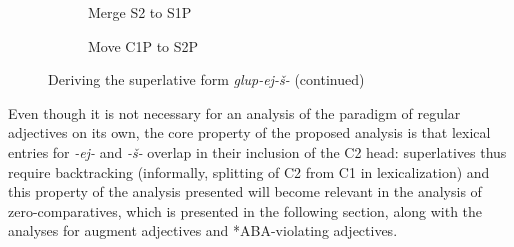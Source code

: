 \documentclass[output=paper,colorlinks,citecolor=brown]{langscibook}
\begin{document}
\begin{figure}
 \begin{subfigure}[b]{0.45\textwidth}
    \centering
 \caption{Merge S2 to S1P}
    \label{kas:fig:glupeis_g}
\end{subfigure}\hfill\begin{subfigure}[b]{0.54\textwidth}
    \centering
    \caption{Move C1P to S2P}
    \label{kas:fig:glupeis_h}
\end{subfigure}
    \caption{Deriving the superlative form \textit{glup-ej-š-} (continued)}
    \label{kas:fig:glupeis-ctd}
\end{figure}

Even though it is not necessary for an analysis of the paradigm of regular adjectives on its own, the core property of the proposed analysis is that lexical entries for \textit{-ej-} and \textit{-š-} overlap in their inclusion of the C2 head: superlatives thus require backtracking (informally, splitting of C2 from C1 in lexicalization) and this property of the analysis presented will become relevant in the analysis of zero-comparatives, which is presented in the following section, along with the analyses for augment adjectives and *ABA-violating adjectives.
\end{document}
